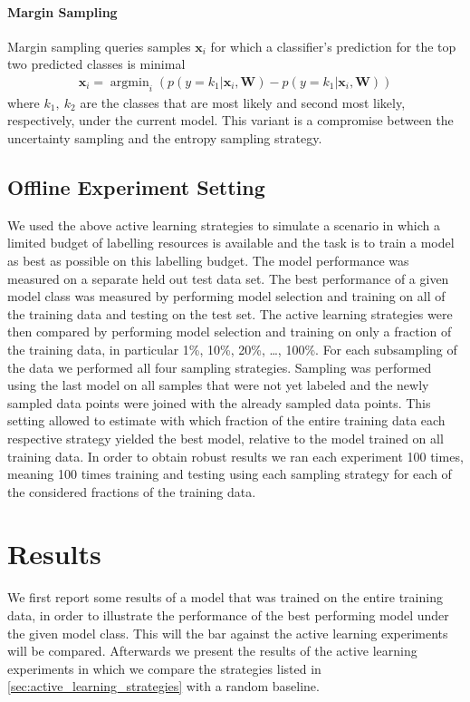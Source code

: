 \documentclass[runningheads,a4paper]{article}
\renewcommand{\vec}[1]{\mathbf{#1}}
\DeclareMathOperator*{\argmin}{argmin}
\begin{document}
\paragraph{Margin Sampling}
Margin sampling queries samples $\vec{x}_i$ for which a classifier's prediction for the top two predicted classes is minimal
\begin{align}\label{eq:entropy_sampling}
\vec{x}_i = \argmin_{i} \left(p(y=k_1|\vec{x}_i,\vec{W}) - p(y=k_1|\vec{x}_i,\vec{W}) \right)
\end{align}
where $k_1,~k_2$ are the classes that are most likely and second most likely, respectively, under the current model. 
This variant is a compromise between the uncertainty sampling and the entropy sampling strategy.

\subsection{Offline Experiment Setting}
We used the above active learning strategies to simulate a scenario in which a limited budget of labelling resources is available and the task is to train a model as best as possible on this labelling budget. The model performance was measured on a separate held out test data set. The best performance of a given model class was measured by performing model selection and training on all of the training data and testing on the test set. The active learning strategies were then compared by performing model selection and training on only a fraction of the training data, in particular 1\%, 10\%, 20\%, \dots, 100\%. For each subsampling of the data we performed all four sampling strategies. Sampling was performed using the last model on all samples that were not yet labeled and the newly sampled data points were joined with the already sampled data points. This setting allowed to estimate with which fraction of the entire training data each respective strategy yielded the best model, relative to the model trained on all training data. In order to obtain robust results we ran each experiment 100 times, meaning 100 times training and testing using each sampling strategy for each of the considered fractions of the training data. 

\section{Results}

We first report some results of a model that was trained on the entire training data, in order to illustrate the performance of the best performing model under the given model class. This will the bar against the active learning experiments will be compared. Afterwards we present the results of the active learning experiments in which we compare the strategies listed in \autoref{sec:active_learning_strategies} with a random baseline. 
\end{document}

